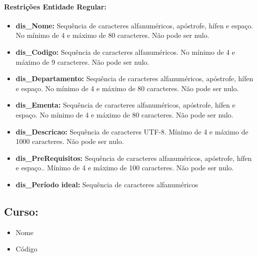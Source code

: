 \documentclass{report}
\begin{document}
\paragraph{Restrições Entidade Regular:}
\begin{itemize}
  \item \textbf{dis\_Nome:} Sequência de caracteres alfanuméricos, apóstrofe, hífen e espaço. No mínimo de 4 e máximo de 80 caracteres. Não pode ser nulo.
  \item \textbf{dis\_Codigo:}  Sequência de caracteres alfanuméricos. No mínimo de 4 e máximo de 9 caracteres. Não pode ser nulo.
  \item \textbf{dis\_Departamento:} Sequência de caracteres alfanuméricos, apóstrofe, hífen e espaço. No mínimo de 4 e máximo de 80 caracteres. Não pode ser nulo.
  \item \textbf{dis\_Ementa:} Sequência de caracteres alfanuméricos, apóstrofe, hífen e espaço. No mínimo de 4 e máximo de 80 caracteres. Não pode ser nulo.
  \item \textbf{dis\_Descricao:} Sequência de caracteres UTF-8. Mínimo de 4 e máximo de 1000 caracteres. Não pode ser nulo.
  \item \textbf{dis\_PreRequisitos:} Sequência de caracteres alfanuméricos, apóstrofe, hífen e espaço.. Mínimo de 4 e máximo de 100 caracteres. Não pode ser nulo.
  \item \textbf{dis\_Período ideal:} Sequência de caracteres alfanuméricos
\end{itemize}


\subsection{Curso:}
\begin{itemize}
  \item Nome
  \item Código
\end{itemize}
\end{document}
